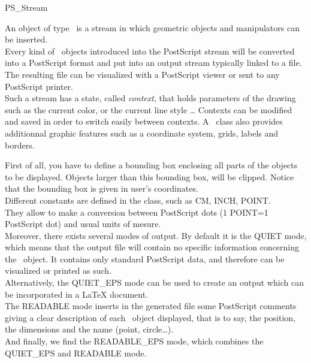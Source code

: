 \begin{ccClass} {PS\_Stream}

\ccDefinition 

An object of type \ccClassName\ is a stream in which geometric
objects and manipulators can be inserted.\\
Every kind of \cgal\ objects introduced into the PostScript stream will
be converted into a PostScript format and put into an output stream
typically linked to a file. The resulting file can be visualized with
a PostScript viewer or sent to any PostScript printer.\\
Such a stream has a state, called {\em context}, that
holds parameters of the drawing such as the current color, or the current line
style \ldots
Contexts can be modified and saved in order to
switch easily between contexts. A \ccClassName\ class also provides
additionnal graphic
features such as a coordinate system, grids, labels and borders.\\
\par
First of all, you have to define a bounding box enclosing all
parts of the objects to be displayed. Objects  
larger than this bounding box, will be clipped. Notice that the
bounding box is given in user's coordinates.\\

Different constants are defined in the \ccClassName\/  class, such as CM, INCH,
POINT.\\
They allow to make a conversion between PostScript dots (1 POINT=1
PostScript dot) and usual units of mesure.\\

Moreover, there exists several modes of output. By default it is the QUIET
mode, which means that the output file will contain no specific information
concerning
the \cgal\ object. It contains only standard  PostScript data, and
therefore can be visualized or printed as such.\\
Alternatively, the QUIET\_EPS mode can be used to create an output which can be
incorporated in a LaTeX document.\\
The READABLE mode inserts in the generated file some PostScript comments
giving a clear description of
each \cgal\ object displayed, that is to say, the position, the
dimensions and the name (point, circle\ldots).\\
And finally, we find the READABLE\_EPS mode, which combines the QUIET\_EPS and
READABLE mode.\\



\end{ccClass}
